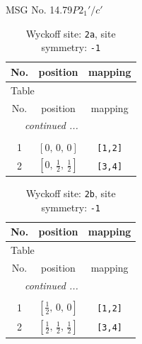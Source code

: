 \documentclass[fleqn,8pt]{jsarticle}
\begin{document}
\setcounter{MaxMatrixCols}{32}

\renewcommand{\tablename}{Table~}
\renewcommand{\figurename}{Figure~}
\begin{center}
\LARGE
MSG No. 14.79\quad$P2_{1}'/c'$
\end{center}
\renewcommand{\arraystretch}{1.2}
\begin{longtable}{ccc}
\caption{Wyckoff site: {\tt 2a}, site symmetry: {\tt -1}}
 \\
 \hline \hline
No. & position & mapping \\ \hline \endfirsthead

\multicolumn{2}{l}{\tablename\ \thetable{}} \\
 \hline \hline
No. & position & mapping \\ \hline \endhead

 \hline \hline
\multicolumn{2}{r}{\footnotesize\it continued ...} \\ \endfoot

 \hline \hline
\multicolumn{2}{r}{} \\ \endlastfoot

1 & $\left[ 0,\, 0,\, 0 \right]$ & {\tt [1,2]} \\ \hline
2 & $\left[ 0,\, \frac{1}{2},\, \frac{1}{2} \right]$ & {\tt [3,4]} \\
\end{longtable}
\renewcommand{\arraystretch}{1.2}
\begin{longtable}{ccc}
\caption{Wyckoff site: {\tt 2b}, site symmetry: {\tt -1}}
 \\
 \hline \hline
No. & position & mapping \\ \hline \endfirsthead

\multicolumn{2}{l}{\tablename\ \thetable{}} \\
 \hline \hline
No. & position & mapping \\ \hline \endhead

 \hline \hline
\multicolumn{2}{r}{\footnotesize\it continued ...} \\ \endfoot

 \hline \hline
\multicolumn{2}{r}{} \\ \endlastfoot

1 & $\left[ \frac{1}{2},\, 0,\, 0 \right]$ & {\tt [1,2]} \\ \hline
2 & $\left[ \frac{1}{2},\, \frac{1}{2},\, \frac{1}{2} \right]$ & {\tt [3,4]} \\
\end{longtable}
\renewcommand{\arraystretch}{1.2}
\end{document}
